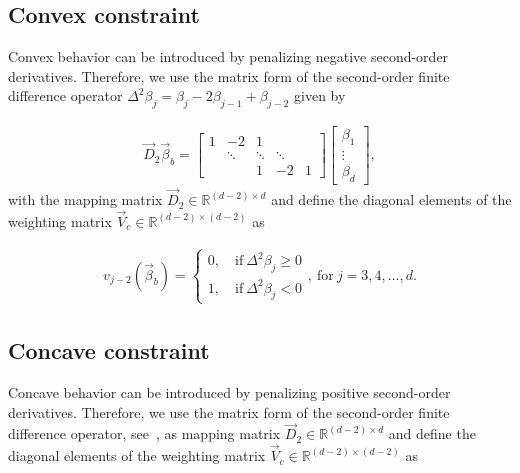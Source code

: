 \subsection{Convex constraint} \label{subsec:ConvC}

Convex behavior can be introduced by penalizing negative second-order derivatives. Therefore, we  use the matrix form of the second-order finite difference operator $\Delta^2 \beta_j = \beta_j - 2\beta_{j-1} + \beta_{j-2}$ given by

\begin{align} \label{eq:FD-operator-order-2}
	\vec{D}_2 \vec{\beta}_b = 
	\begin{bmatrix} 
		1& -2     & 1   \\  
		 & \ddots & \ddots  & \ddots \\ 
		 &        & 1       & -2     & 1 
	\end{bmatrix} \begin{bmatrix}
		\beta_1 \\
		\vdots \\
		\beta_d
	\end{bmatrix},
\end{align}
%
with the mapping matrix $\vec{D}_2 \in \mathbb{R}^{(d-2)\times d}$ and define the diagonal elements of the weighting matrix $\vec{V}_c \in \mathbb{R}^{(d-2) \times (d-2)}$ as

\begin{align} \label{eq:weighting-matrix-conv-diagonal}
	v_{j-2}(\vec{\beta}_b) = \begin{cases}
		0, \quad \text{if} \ \Delta^2\beta_j \ge 0 \\ 
		1, \quad \text{if} \ \Delta^2\beta_j < 0
	\end{cases}, \ \text{for} \ j=3,4, \dots, d.
\end{align}

\subsection{Concave constraint} \label{subsec:ConcC}

Concave behavior can be introduced by penalizing positive second-order derivatives. Therefore, we  use the matrix form of the second-order finite difference operator, see~, as mapping matrix $\vec{D}_2 \in \mathbb{R}^{(d-2)\times d}$ and define the diagonal elements of the weighting matrix $\vec{V}_c \in \mathbb{R}^{(d-2) \times (d-2)}$ as

